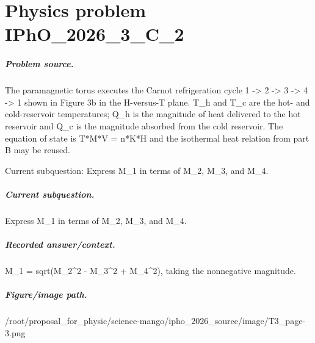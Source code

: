 
\chapter{Physics problem IPhO\_2026\_3\_C\_2}
\label{ch:IPhO2026Problems_problem_IPhO_2026_3_C_2}

\paragraph{Problem source.}
The paramagnetic torus executes the Carnot refrigeration cycle
1 -> 2 -> 3 -> 4 -> 1 shown in Figure 3b in the H-versus-T plane.  T\_h and T\_c
are the hot- and cold-reservoir temperatures; Q\_h is the magnitude of heat
delivered to the hot reservoir and Q\_c is the magnitude absorbed from the cold
reservoir.  The equation of state is T*M*V = n*K*H and the isothermal heat
relation from part B may be reused.

Current subquestion:
Express M\_1 in terms of M\_2, M\_3, and M\_4.

\paragraph{Current subquestion.}
Express M\_1 in terms of M\_2, M\_3, and M\_4.

\paragraph{Recorded answer/context.}
M\_1 = sqrt(M\_2\textasciicircum{}2 - M\_3\textasciicircum{}2 + M\_4\textasciicircum{}2), taking the nonnegative magnitude.

\paragraph{Figure/image path.}
/root/proposal\_for\_physic/science-mango/ipho\_2026\_source/image/T3\_page-3.png

